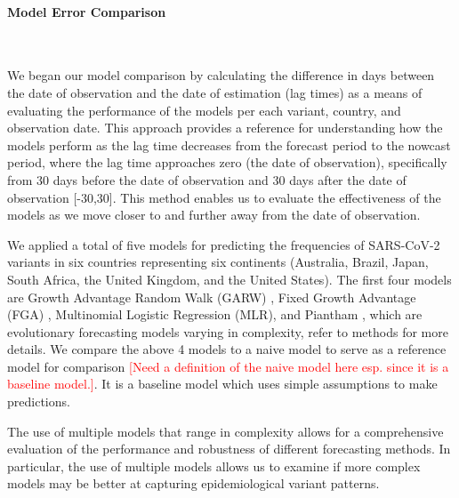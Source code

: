 \documentclass[11pt,oneside,letterpaper]{article}
\def\jhc#1{\textcolor{red}{[#1]}}
\begin{document}
\paragraph{Model Error Comparison}\

We began our model comparison by calculating the difference in days between the date of observation and the date of estimation (lag times) as a means of evaluating the performance of the models per each variant, country, and observation date.
This approach provides a reference for understanding how the models perform as the lag time decreases from the forecast period to the nowcast period, where the lag time approaches zero (the date of observation), specifically from 30 days before the date of observation and 30 days after the date of observation [-30,30].
This method enables us to evaluate the effectiveness of the models as we move closer to and further away from the date of observation.

We applied a total of five models for predicting the frequencies of SARS-CoV-2 variants in six countries representing six continents (Australia, Brazil, Japan, South Africa, the United Kingdom, and the United States).
The first four models are Growth Advantage Random Walk (GARW) \cite{figgins2022sars}, Fixed Growth Advantage (FGA) \cite{figgins2022sars}, Multinomial Logistic Regression (MLR), and Piantham \cite{piantham2021estimating}, which are evolutionary forecasting models varying in complexity, refer to methods for more details.
We compare the above 4 models to a naive model to serve as a reference model for comparison \jhc{Need a definition of the naive model here esp. since it is a baseline model.}.
It is a baseline model which uses simple assumptions to make predictions. %

The use of multiple models that range in complexity allows for a comprehensive evaluation of the performance and robustness of different forecasting methods.
In particular, the use of multiple models allows us to examine if more complex models may be better at capturing epidemiological variant patterns.
\end{document}
